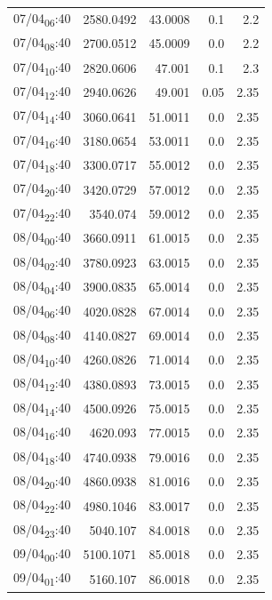 \documentclass[11pt]{article}
\begin{document}
\begin{center}
\begin{tabular}{lrrrr}
07/04\textsubscript{06}:40 & 2580.0492 & 43.0008 & 0.1 & 2.2\\[0pt]
07/04\textsubscript{08}:40 & 2700.0512 & 45.0009 & 0.0 & 2.2\\[0pt]
07/04\textsubscript{10}:40 & 2820.0606 & 47.001 & 0.1 & 2.3\\[0pt]
07/04\textsubscript{12}:40 & 2940.0626 & 49.001 & 0.05 & 2.35\\[0pt]
07/04\textsubscript{14}:40 & 3060.0641 & 51.0011 & 0.0 & 2.35\\[0pt]
07/04\textsubscript{16}:40 & 3180.0654 & 53.0011 & 0.0 & 2.35\\[0pt]
07/04\textsubscript{18}:40 & 3300.0717 & 55.0012 & 0.0 & 2.35\\[0pt]
07/04\textsubscript{20}:40 & 3420.0729 & 57.0012 & 0.0 & 2.35\\[0pt]
07/04\textsubscript{22}:40 & 3540.074 & 59.0012 & 0.0 & 2.35\\[0pt]
08/04\textsubscript{00}:40 & 3660.0911 & 61.0015 & 0.0 & 2.35\\[0pt]
08/04\textsubscript{02}:40 & 3780.0923 & 63.0015 & 0.0 & 2.35\\[0pt]
08/04\textsubscript{04}:40 & 3900.0835 & 65.0014 & 0.0 & 2.35\\[0pt]
08/04\textsubscript{06}:40 & 4020.0828 & 67.0014 & 0.0 & 2.35\\[0pt]
08/04\textsubscript{08}:40 & 4140.0827 & 69.0014 & 0.0 & 2.35\\[0pt]
08/04\textsubscript{10}:40 & 4260.0826 & 71.0014 & 0.0 & 2.35\\[0pt]
08/04\textsubscript{12}:40 & 4380.0893 & 73.0015 & 0.0 & 2.35\\[0pt]
08/04\textsubscript{14}:40 & 4500.0926 & 75.0015 & 0.0 & 2.35\\[0pt]
08/04\textsubscript{16}:40 & 4620.093 & 77.0015 & 0.0 & 2.35\\[0pt]
08/04\textsubscript{18}:40 & 4740.0938 & 79.0016 & 0.0 & 2.35\\[0pt]
08/04\textsubscript{20}:40 & 4860.0938 & 81.0016 & 0.0 & 2.35\\[0pt]
08/04\textsubscript{22}:40 & 4980.1046 & 83.0017 & 0.0 & 2.35\\[0pt]
08/04\textsubscript{23}:40 & 5040.107 & 84.0018 & 0.0 & 2.35\\[0pt]
09/04\textsubscript{00}:40 & 5100.1071 & 85.0018 & 0.0 & 2.35\\[0pt]
09/04\textsubscript{01}:40 & 5160.107 & 86.0018 & 0.0 & 2.35\\[0pt]

\end{tabular}
\end{center}
\end{document}
